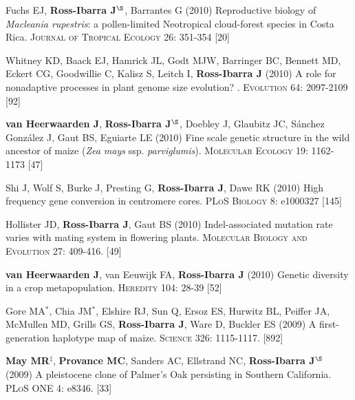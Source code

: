 \documentclass[letterpaper,10pt]{article}
\begin{document}
\begin{etaremune}
\item Fuchs EJ, {\bf Ross-Ibarra J}$^\S$, Barrantes G (2010) Reproductive biology of \emph{Macleania rupestris}: a pollen-limited Neotropical cloud-forest species in Costa Rica.  \textsc{Journal of Tropical Ecology} 26: 351-354
 [20]\\


\item Whitney KD, Baack EJ, Hamrick JL, Godt MJW, Barringer BC, Bennett MD, Eckert CG, Goodwillie C, Kalisz S, Leitch I, {\bf Ross-Ibarra J} (2010) A role for nonadaptive processes in plant genome size evolution? . \textsc{Evolution} 64: 2097-2109
 [92]\\


\item {\bf van Heerwaarden J}, {\bf Ross-Ibarra J}$^\S$, Doebley J, Glaubitz JC, S\'{a}nchez Gonz\'{a}lez J, Gaut BS, Eguiarte LE (2010) Fine scale genetic structure in the wild ancestor of maize (\emph{Zea mays} ssp. \emph{parviglumis}).  \textsc{Molecular Ecology} 19: 1162-1173
 [47]\\


\item Shi J, Wolf S, Burke J, Presting G, {\bf Ross-Ibarra J}, Dawe RK (2010) High frequency gene conversion in centromere cores.  \textsc{PLoS Biology} 8: e1000327
 [145]\\


\item Hollister JD, {\bf Ross-Ibarra J}, Gaut BS (2010) Indel-associated mutation rate varies with mating system in flowering plants.  \textsc{Molecular Biology and Evolution} 27: 409-416.
 [49]\\

\item {\bf van Heerwaarden J}, van Eeuwijk FA, {\bf Ross-Ibarra J} (2010) Genetic diversity in a crop metapopulation.  \textsc{Heredity} 104: 28-39
 [52]\\


\item Gore MA$^*$, Chia JM$^*$, Elshire RJ, Sun Q, Ersoz ES, Hurwitz BL, Peiffer JA, McMullen MD, Grills GS, {\bf Ross-Ibarra J}, Ware D, Buckler ES (2009) A first-generation haplotype map of maize.  \textsc{Science 326}: 1115-1117.
 [892]\\


\item {\bf May MR}$^\ddagger$, {\bf Provance MC}, Sanders AC, Ellstrand NC, {\bf Ross-Ibarra J}$^\S$ (2009) A pleistocene clone of Palmer's Oak persisting in Southern California.  \textsc{PLoS ONE} 4: e8346.
 [33]\\



\end{etaremune}
\end{document}
